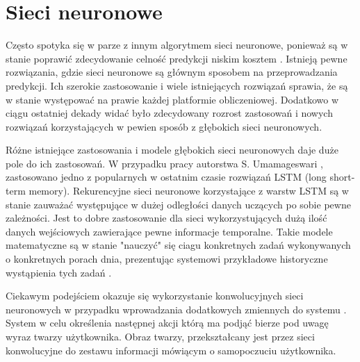 

\section{Sieci neuronowe}


Często spotyka się w parze z innym algorytmem sieci neuronowe, ponieważ są w stanie poprawić zdecydowanie celność predykcji niskim kosztem \cite{episode_discovery_1}. Istnieją pewne rozwiązania, gdzie sieci neuronowe są głównym sposobem na przeprowadzania predykcji. Ich szerokie zastosowanie i wiele istniejących rozwiązań sprawia, że są w stanie występować na prawie każdej platformie obliczeniowej. Dodatkowo w ciągu ostatniej dekady widać było zdecydowany rozrost zastosowań i nowych rozwiązań korzystających w pewien sposób z głębokich sieci neuronowych.

Różne istniejące zastosowania i modele głębokich sieci neuronowych daje duże pole do ich zastosowań. W przypadku pracy autorstwa S. Umamageswari \cite{neural_1}, zastosowano jedno z popularnych w ostatnim czasie rozwiązań LSTM (long short-term memory). Rekurencyjne sieci neuronowe korzystające z warstw LSTM są w stanie zauważać występujące w dużej odległości danych uczących po sobie pewne zależności. Jest to dobre zastosowanie dla sieci wykorzystujących dużą ilość danych wejściowych zawierające pewne informacje temporalne. Takie modele matematyczne są w stanie "nauczyć" się ciagu konkretnych zadań wykonywanych o konkretnych porach dnia, prezentując systemowi przykładowe historyczne wystąpienia tych zadań \cite{ksiazka_tf}.

Ciekawym podejściem okazuje się wykorzystanie konwolucyjnych sieci neuronowych w przypadku wprowadzania dodatkowych zmiennych do systemu \cite{conv_1}. System w celu określenia następnej akcji którą ma podjąć bierze pod uwagę wyraz twarzy użytkownika. Obraz twarzy, przekształcany jest przez sieci konwolucyjne do zestawu informacji mówiącym o samopoczuciu użytkownika.

